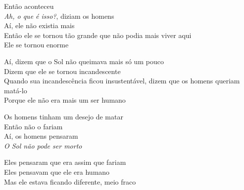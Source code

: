 \bigskip

\begin{linenumbers}\begingroup\raggedright
\noindent Então aconteceu\\
\textit{Ah, o que é isso?}, diziam os homens\\
Aí, ele não existia mais\\
Então ele se tornou tão grande que não podia mais viver aqui\\
Ele se tornou enorme
\end{linenumbers}\endgroup

\bigskip

\begin{linenumbers}\begingroup\raggedright
\noindent Aí, dizem que o Sol não queimava mais só um pouco\\
Dizem que ele se tornou incandescente\\
Quando sua incandescência ficou insustentável, dizem que os homens
queriam matá-lo\\
Porque ele não era mais um ser humano
\end{linenumbers}\endgroup

\bigskip

\begin{linenumbers}\begingroup\raggedright
\noindent Os homens tinham um desejo de matar\\
Então não o fariam\\
Aí, os homens pensaram\\
\textit{O Sol não pode ser morto}
\end{linenumbers}\endgroup

\bigskip

\begin{linenumbers}\begingroup\raggedright
\noindent Eles pensaram que era assim que fariam\\
Eles pensavam que ele era humano\\
Mas ele estava ficando diferente, meio fraco
\end{linenumbers}\endgroup


